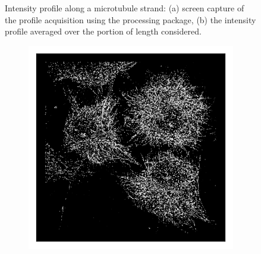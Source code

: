 \begin{figure}[htbp]
\begin{subfigure}[b]{0.49\textwidth}
        \caption{}
        \label{fig:microtubules_width_analysis}
    \end{subfigure}
    \label{fig:microtubules_width}
    \caption{Intensity profile along a microtubule strand: (a) screen capture of the profile acquisition using the  processing package, (b) the intensity profile averaged over the portion of length considered.}
\end{figure}

\begin{figure}
    \begin{subfigure}{0.32\textwidth}
        \includegraphics[width=\textwidth]{figures/test_scatter.png}
        \caption{}
    \end{subfigure}
    \begin{subfigure}{0.32\textwidth}

\end{subfigure}
\end{figure}
